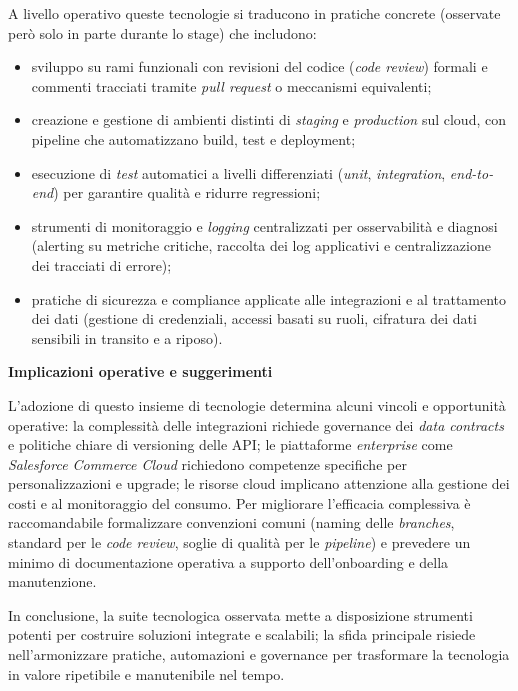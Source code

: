 A livello operativo queste tecnologie si traducono in pratiche concrete (osservate però solo in parte durante lo stage) che includono:

\begin{itemize}
\item sviluppo su rami funzionali con revisioni del codice (\emph{code review}) formali e commenti tracciati tramite \emph{pull request} o meccanismi equivalenti;
\item creazione e gestione di ambienti distinti di \emph{staging} e \emph{production} sul cloud, con pipeline che automatizzano build, test e deployment;
\item esecuzione di \emph{test} automatici a livelli differenziati (\emph{unit}, \emph{integration}, \emph{end-to-end}) per garantire qualità e ridurre regressioni;
\item strumenti di monitoraggio e \emph{logging} centralizzati per osservabilità e diagnosi (alerting su metriche critiche, raccolta dei log applicativi e centralizzazione dei tracciati di errore);
\item pratiche di sicurezza e compliance applicate alle integrazioni e al trattamento dei dati (gestione di credenziali, accessi basati su ruoli, cifratura dei dati sensibili in transito e a riposo).
\end{itemize}

\medskip

\noindent\textbf{Implicazioni operative e suggerimenti}

L’adozione di questo insieme di tecnologie determina alcuni vincoli e opportunità operative: la complessità delle integrazioni richiede governance dei \emph{data contracts} e 
politiche chiare di versioning delle API; le piattaforme \emph{enterprise} come \emph{Salesforce Commerce Cloud} richiedono competenze specifiche per personalizzazioni e upgrade; 
le risorse cloud implicano attenzione alla gestione dei costi e al monitoraggio del consumo. Per migliorare l’efficacia complessiva è raccomandabile formalizzare convenzioni comuni 
(naming delle \emph{branches}, standard per le \emph{code review}, soglie di qualità per le \emph{pipeline}) e prevedere un minimo di documentazione operativa a supporto dell’onboarding e della manutenzione.

In conclusione, la suite tecnologica osservata mette a disposizione strumenti potenti per costruire soluzioni integrate e scalabili; la sfida principale risiede nell’armonizzare pratiche, 
automazioni e governance per trasformare la tecnologia in valore ripetibile e manutenibile nel tempo.


